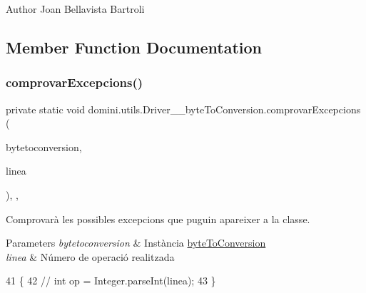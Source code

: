 \begin{DoxyAuthor}{Author}
Joan Bellavista Bartroli 
\end{DoxyAuthor}


\subsection{Member Function Documentation}
\mbox{\label{classdomini_1_1utils_1_1Driver____byteToConversion_a82c589da57bedb139b9254c8623a7fd4}} 
\subsubsection{\texorpdfstring{comprovar\+Excepcions()}{comprovarExcepcions()}}
{\footnotesize\ttfamily private static void domini.\+utils.\+Driver\+\_\+\+\_\+byte\+To\+Conversion.\+comprovar\+Excepcions (\begin{DoxyParamCaption}\item[{\hyperlink{classdomini_1_1utils_1_1byteToConversion}{byte\+To\+Conversion}}]{bytetoconversion,  }\item[{String}]{linea }\end{DoxyParamCaption})\hspace{0.3cm}{\ttfamily [inline]}, {\ttfamily [static]}, {\ttfamily [private]}}



Comprovarà les possibles excepcions que puguin apareixer a la classe. 


\begin{DoxyParams}{Parameters}
{\em bytetoconversion} & Instància \hyperlink{classdomini_1_1utils_1_1byteToConversion}{byte\+To\+Conversion} \\
\hline
{\em linea} & Número de operació realitzada \\
\hline
\end{DoxyParams}

\begin{DoxyCode}
41                                                                                             \{
42         \textcolor{comment}{// int op = Integer.parseInt(linea);}
43     \}
\end{DoxyCode}
\mbox{\label{classdomini_1_1utils_1_1Driver____byteToConversion_a19510acac17ad211538d878b4de039b8}} 
